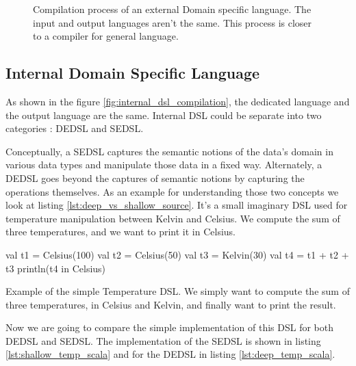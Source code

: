 \begin{figure}[ht]
  \centering
  \caption[Compilation process of an external \gls{DSL}]{Compilation process of
    an external Domain specific language. The input and output languages aren't
    the same. This process is closer to a compiler for general language.}
  \label{fig:external_dsl_compilation}
\end{figure}

\subsection{Internal Domain Specific Language}
\label{sec:internal_dsl}

As shown in the figure \ref{fig:internal_dsl_compilation}, the dedicated language
and the output language are the same. Internal \gls{DSL} could be separate into
two categories : \gls{DEDSL} and \gls{SEDSL}.

Conceptually, a \gls{SEDSL} captures the semantic notions of the data's domain in
various data types and manipulate those data in a fixed way. Alternately, a
\gls{DEDSL} goes beyond the captures of semantic notions by capturing the
operations themselves. As an example for understanding those two concepts we look
at listing \ref{lst:deep_vs_shallow_source}. It's a small imaginary DSL used for
temperature manipulation between Kelvin and Celsius. We compute the sum
of three temperatures, and we want to print it in Celsius.

\begin{listing}[ht]
\centering
\begin{scalacode}
val t1 = Celsius(100)
val t2 = Celsius(50)
val t3 = Kelvin(30)
val t4 = t1 + t2 + t3
println(t4 in Celsius)
\end{scalacode}
\caption[Usage of the simple Temperature \gls{DSL}]{Example of the simple
Temperature \gls{DSL}. We simply want to compute the sum of three temperatures,
in Celsius and Kelvin, and finally want to print the result.}
\label{lst:deep_vs_shallow_source}
\end{listing}

Now we are going to compare the simple implementation of this \gls{DSL} for
both \gls{DEDSL} and \gls{SEDSL}. The implementation of the \gls{SEDSL} is
shown in listing \ref{lst:shallow_temp_scala} and for the \gls{DEDSL} in
listing \ref{lst:deep_temp_scala}.

